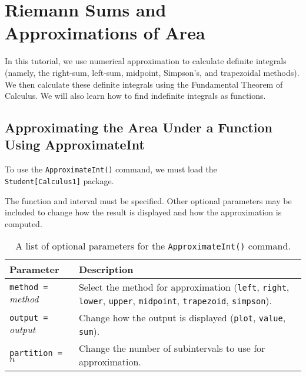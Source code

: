 \chapter{Riemann Sums and Approximations of Area}
\label{chp:riemann_sums_and_area_approximation}	

In this tutorial, we use numerical approximation to calculate definite integrals (namely, the right-sum, left-sum, midpoint, Simpson's, and trapezoidal methods). We then calculate these definite integrals using the Fundamental Theorem of Calculus. We will also learn how to find indefinite integrals as functions.

\section{Approximating the Area Under a Function Using ApproximateInt}

To use the \texttt{ApproximateInt()} command, we must load the \\
\noindent\texttt{Student[Calculus1]} package.

The function and interval must be specified. Other optional parameters may be included to change how the result is displayed and how the approximation is computed.


\begin{table}
\label{tbl:approximateint_options}
\centering
\begin{tabular}{lp{2.5in}}
\hline
Parameter & Description\\
\hline
\texttt{method = }\textit{method}	& Select the method for approximation (\texttt{left}, \texttt{right}, \texttt{lower}, 
									\texttt{upper}, \texttt{midpoint}, \texttt{trapezoid}, \texttt{simpson}).\\
\texttt{output = }\textit{output}	& Change how the output is displayed (\texttt{plot}, \texttt{value}, \texttt{sum}).\\
\texttt{partition = $n$}			& Change the number of subintervals to use for approximation.\\
\hline
\end{tabular}
\caption{A list of optional parameters for the \texttt{ApproximateInt()} command.}
\end{table}

